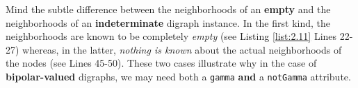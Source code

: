 Mind the subtle difference between the neighborhoods of an \textbf{empty} and the neighborhoods of an \textbf{indeterminate} digraph instance. In the first kind, the neighborhoods are known to be completely \emph{empty}  (see Listing \ref{list:2.11} Lines 22-27) whereas, in the latter, \emph{nothing is known} about the actual neighborhoods of the nodes  (see Lines 45-50). These two cases illustrate why in the case of \textbf{bipolar-valued} digraphs, we may need both a \texttt{gamma} \textbf{and} a \texttt{notGamma} attribute.

\clearpage


%